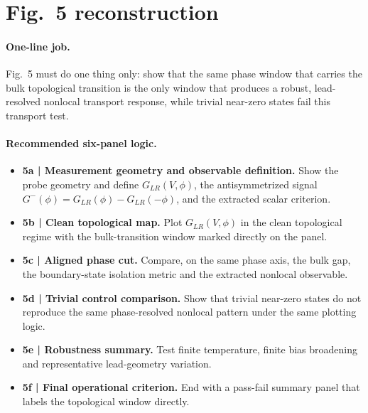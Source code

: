 \section*{Fig.~5 reconstruction}

\paragraph{One-line job.}
Fig.~5 must do one thing only: show that the same phase window that carries the bulk topological transition is the only window that produces a robust, lead-resolved nonlocal transport response, while trivial near-zero states fail this transport test.

\paragraph{Recommended six-panel logic.}
\begin{itemize}
\item \textbf{5a | Measurement geometry and observable definition.} Show the probe geometry and define $G_{LR}(V,\phi)$, the antisymmetrized signal $G^{-}(\phi)=G_{LR}(\phi)-G_{LR}(-\phi)$, and the extracted scalar criterion.
\item \textbf{5b | Clean topological map.} Plot $G_{LR}(V,\phi)$ in the clean topological regime with the bulk-transition window marked directly on the panel.
\item \textbf{5c | Aligned phase cut.} Compare, on the same phase axis, the bulk gap, the boundary-state isolation metric and the extracted nonlocal observable.
\item \textbf{5d | Trivial control comparison.} Show that trivial near-zero states do not reproduce the same phase-resolved nonlocal pattern under the same plotting logic.
\item \textbf{5e | Robustness summary.} Test finite temperature, finite bias broadening and representative lead-geometry variation.
\item \textbf{5f | Final operational criterion.} End with a pass-fail summary panel that labels the topological window directly.
\end{itemize}

